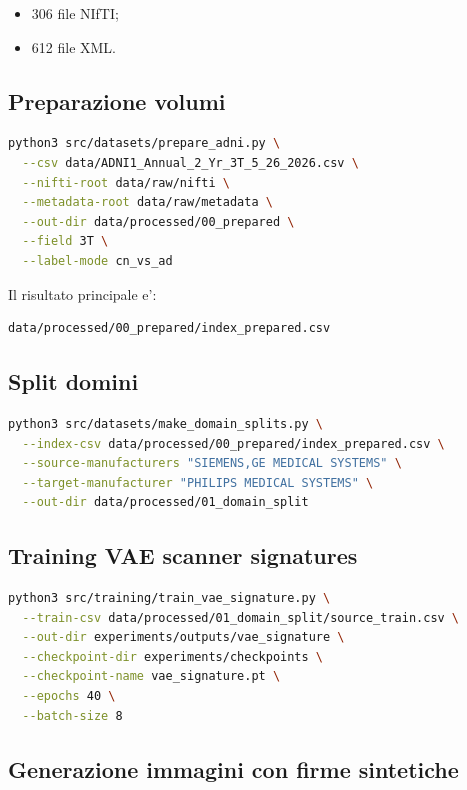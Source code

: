 \documentclass[12pt,a4paper]{article}
\begin{document}
\begin{itemize}[leftmargin=1.2cm]
    \item 306 file NIfTI;
    \item 612 file XML.
\end{itemize}

\subsection{Preparazione volumi}

\begin{lstlisting}[language=bash]
python3 src/datasets/prepare_adni.py \
  --csv data/ADNI1_Annual_2_Yr_3T_5_26_2026.csv \
  --nifti-root data/raw/nifti \
  --metadata-root data/raw/metadata \
  --out-dir data/processed/00_prepared \
  --field 3T \
  --label-mode cn_vs_ad
\end{lstlisting}

Il risultato principale e':

\begin{lstlisting}
data/processed/00_prepared/index_prepared.csv
\end{lstlisting}

\subsection{Split domini}

\begin{lstlisting}[language=bash]
python3 src/datasets/make_domain_splits.py \
  --index-csv data/processed/00_prepared/index_prepared.csv \
  --source-manufacturers "SIEMENS,GE MEDICAL SYSTEMS" \
  --target-manufacturer "PHILIPS MEDICAL SYSTEMS" \
  --out-dir data/processed/01_domain_split
\end{lstlisting}

\subsection{Training VAE scanner signatures}

\begin{lstlisting}[language=bash]
python3 src/training/train_vae_signature.py \
  --train-csv data/processed/01_domain_split/source_train.csv \
  --out-dir experiments/outputs/vae_signature \
  --checkpoint-dir experiments/checkpoints \
  --checkpoint-name vae_signature.pt \
  --epochs 40 \
  --batch-size 8
\end{lstlisting}

\subsection{Generazione immagini con firme sintetiche}
\end{document}
